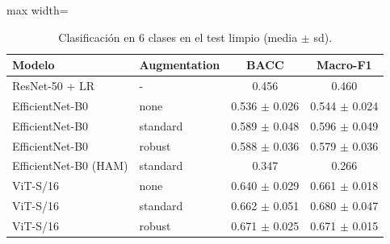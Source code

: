 \begin{table}[t]
\caption{Clasificación en 6 clases en el test limpio (media $\pm$ sd).}
\label{tab:main_6class}
\centering
\begin{adjustbox}{max width=\linewidth}
\begin{tabular}{llcc}
\toprule
Modelo & Augmentation & BACC & Macro-F1 \\
\midrule
ResNet-50 + LR & - & 0.456 & 0.460 \\
EfficientNet-B0 & none & 0.536 $\pm$ 0.026 & 0.544 $\pm$ 0.024 \\
EfficientNet-B0 & standard & 0.589 $\pm$ 0.048 & 0.596 $\pm$ 0.049 \\
EfficientNet-B0 & robust & 0.588 $\pm$ 0.036 & 0.579 $\pm$ 0.036 \\
EfficientNet-B0 (HAM) & standard & 0.347 & 0.266 \\
ViT-S/16 & none & 0.640 $\pm$ 0.029 & 0.661 $\pm$ 0.018 \\
ViT-S/16 & standard & 0.662 $\pm$ 0.051 & 0.680 $\pm$ 0.047 \\
ViT-S/16 & robust & 0.671 $\pm$ 0.025 & 0.671 $\pm$ 0.015 \\
\bottomrule
\end{tabular}
\end{adjustbox}
\end{table}
